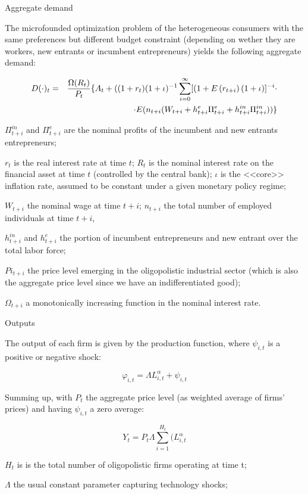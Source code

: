 \documentclass[9pt]{beamer}
\begin{document}
\begin{frame}{Aggregate demand}

The microfounded optimization problem of the heterogeneous consumers with the same preferences but different budget constraint (depending on wether they are workers, new entrants or incumbent entrepreneurs) yields the following aggregate demand:

\begin{eqnarray}
D(\cdot )_{t} &=&\frac{\Omega (R_{t})}{P_{t}}\{A_{t}+((1+r_{t})(1+\iota
)^{-1}\sum_{i=0}^{\infty }[(1+E\left( r_{t+i}\right) (1+\iota )]^{-i}\cdot 
\notag \\
&&\cdot E(n_{t+i}(W_{t+i}+h_{t+i}^{e}\Pi _{t+i}^{e}+h_{t+i}^{in}\Pi
_{t+i}^{in}))\}  \label{per capita distrib cons_1}
\end{eqnarray}

\small

$\Pi_{t+i}^{in}$ and $\Pi _{t+i}^{e}$ are the nominal profits of the incumbent and new entrants entrepreneurs;

$r_{t}$ is  the real interest rate at time $t$; $R_{t}$ is the nominal interest rate on the financial asset at time $t$ (controlled by the central bank); $\iota$ is the <<core>> inflation rate, assumed to be constant under a given monetary policy regime;

$W_{t+i}$ the nominal wage at time $t+i$; $n_{t+i}$ the total number of employed individuals at time $t+i$,

$h_{t+i}^{in}$ and $h_{t+i}^{e}$ the portion of incumbent entrepreneurs and new entrant over the total labor force;

$Pi _{t+i}$ the price level emerging in the oligopolistic industrial sector (which is also the aggregate price level since we have an indifferentiated good);

$\Omega_{t+i}$ a monotonically increasing function in the nominal interest rate.

\end{frame}


\begin{frame}{Outputs}

The output of each firm is given by the production function, where $\psi _{i,t}$ is a positive or negative shock:

\begin{equation}
\varphi _{i,t}=\Lambda L_{i,t}^{\alpha }+\psi _{i,t}
\end{equation}

Summing up, with $P_t$ the aggregate price level (as weighted average of firms' prices) and having $\psi _{i,t}$ a zero average:

\begin{equation}
Y_{t}=P_{t}\Lambda \overset{H_{t}}{\underset{i=1}{\sum }}(L_{i,t}^{\alpha}
\end{equation}

\small
$H_{t}$ is is the total number of oligopolistic firms operating at time t;

$\Lambda$ the usual constant parameter capturing technology shocks;

\end{frame}
\end{document}
